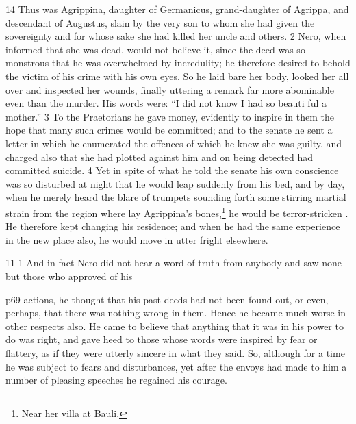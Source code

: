 14
Thus was Agrippina, daughter of Germanicus, grand-daughter of Agrippa, and descendant of Augustus, slain by the very son to whom she had given the sovereignty and for whose sake she had killed her uncle and others. 2 Nero, when informed that she was dead, would not believe it, since the deed was so monstrous that he was overwhelmed by incredulity; he therefore desired to behold the victim of his crime with his own eyes. So he laid bare her body, looked her all over and inspected her wounds, finally uttering a remark far more abominable even than the murder. His words were: ``I did not know I had so beauti ­ful a mother.'' 3 To the Praetorians he gave money, evidently to inspire in them the hope that many such crimes would be committed; and to the senate he sent a letter in which he enumerated the offences of which he knew she was guilty, and charged also that she had plotted against him and on being detected had committed suicide. 4 Yet in spite of what he told the senate his own conscience was so disturbed at night that he would leap suddenly from his bed, and by day, when he merely heard the blare of trumpets sounding forth some stirring martial strain from the region where lay Agrippina's bones,\texthebrew{⁠}\footnote{Near her villa at Bauli.

} he would be terror-stricken . He therefore kept changing his residence; and when he had the same experience in the new place also, he would move in utter fright elsewhere.

11
1 And in fact Nero did not hear a word of truth from anybody and saw none but those who approved of his

p69 actions, he thought that his past deeds had not been found out, or even, perhaps, that there was nothing wrong in them. Hence he became much worse in other respects also. He came to believe that anything that it was in his power to do was right, and gave heed to those whose words were inspired by fear or flattery, as if they were utterly sincere in what they said. So, although for a time he was subject to fears and disturbances, yet after the envoys had made to him a number of pleasing speeches he regained his courage.

